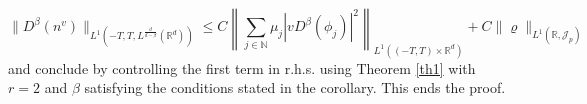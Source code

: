 \documentclass[12pt]{article}
\def \Rm {\mathbb R}
\def \Nm {\mathbb N}
\newcommand{\eps}{\varepsilon}
\newcommand{\calJ}{\mathcal J}
\def\fref#1{{\rm (\ref{#1})}}
\newcommand{\be}{\begin{equation}}
\newcommand{\ee}{\end{equation}}
\DeclarePairedDelimiter\bra{\langle}{\rvert}
\DeclarePairedDelimiter\ket{\lvert}{\rangle}
\begin{document}
$$
\|D^{\beta}(n^v) \|_{L^1(-T,T,L^{\frac{d}{d-\beta}}(\Rm^d))} \leq  C \left\| \sum_{j\in \Nm} \mu_j |v D^\beta(\phi_j)|^2 \right\|_{L^1((-T,T) \times \Rm^d)} + C \|\varrho \|_{L^1(\Rm,\calJ_p)}
$$
and conclude by controlling the first term in r.h.s. using Theorem \ref{th1} with $r=2$ and $\beta$ satisfying the conditions stated in the corollary.  This ends the proof. %


\end{document}
